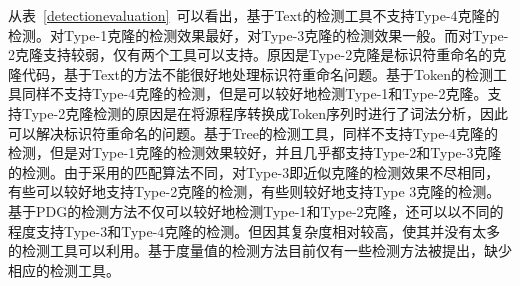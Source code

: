 从表~\ref{detectionevaluation}~可以看出，基于Text的检测工具不支持Type-4克隆的检测。对Type-1克隆的检测效果最好，对Type-3克隆的检测效果一般。而对Type-2克隆支持较弱，仅有两个工具可以支持。原因是Type-2克隆是标识符重命名的克隆代码，基于Text的方法不能很好地处理标识符重命名问题。基于Token的检测工具同样不支持Type-4克隆的检测，但是可以较好地检测Type-1和Type-2克隆。支持Type-2克隆检测的原因是在将源程序转换成Token序列时进行了词法分析，因此可以解决标识符重命名的问题。基于Tree的检测工具，同样不支持Type-4克隆的检测，但是对Type-1克隆的检测效果较好，并且几乎都支持Type-2和Type-3克隆的检测。由于采用的匹配算法不同，对Type-3即近似克隆的检测效果不尽相同，有些可以较好地支持Type-2克隆的检测，有些则较好地支持Type 3克隆的检测。基于PDG的检测方法不仅可以较好地检测Type-1和Type-2克隆，还可以以不同的程度支持Type-3和Type-4克隆的检测。但因其复杂度相对较高，使其并没有太多的检测工具可以利用。基于度量值的检测方法目前仅有一些检测方法被提出\cite{kontogiannis1996pattern}\cite{mayrand1996experiment}，缺少相应的检测工具。



